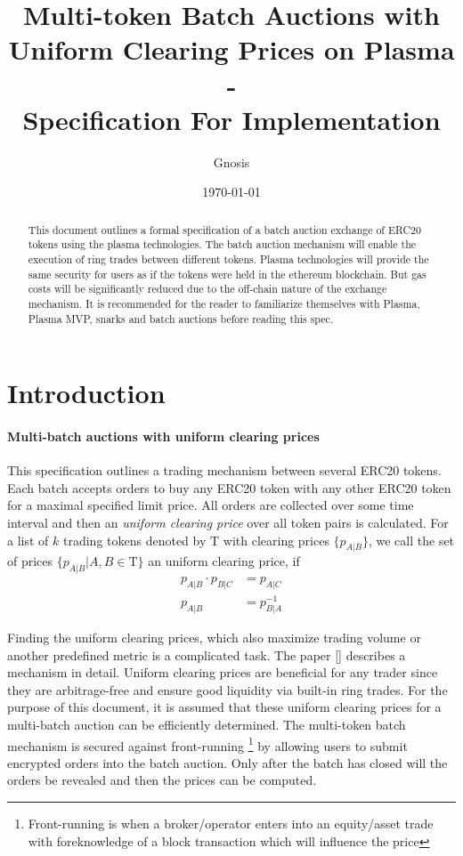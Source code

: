 \documentclass[11pt,parskip=full]{scrartcl}%
\title{
  Multi-token Batch Auctions with Uniform Clearing Prices on Plasma\\
  - \\
  \Large Specification For Implementation}
\author{Gnosis}
\date{\today}
\newcommand{\Tau}{\mathrm{T}}
\newcommand*{\erc}{ERC20 }
\begin{document}
\maketitle


\begin{abstract}

This document outlines a formal specification of a batch auction exchange of ERC20 tokens using the plasma technologies. The batch auction mechanism will enable the execution of ring trades between different tokens. Plasma technologies will provide the same security for users as if the tokens were held in the ethereum blockchain. But gas costs will be significantly reduced due to the off-chain nature of the exchange mechanism. It is recommended for the reader to familiarize themselves with Plasma\cite{plasma}, Plasma MVP\cite{MVP}, snarks\cite{snarks} and batch auctions\cite{batch} before reading this spec.

\end{abstract}

\tableofcontents

\newpage
\section{Introduction}
\label{sec:introduction}

\paragraph{Multi-batch auctions with uniform clearing prices}

This specification outlines a trading mechanism between several \erc tokens. Each batch accepts orders to buy any \erc token with any other \erc token for a maximal specified limit price. All orders are collected over some time interval and then an \emph{uniform clearing price} over all token pairs is calculated. 
For a list of $k$ trading tokens denoted by $\Tau$ with clearing prices $\{p_{A|B}\}$, we call the set of prices $\{p_{A|B}| A,B \in \Tau \}$ an uniform clearing price, if
\begin{align} \label{eq:arbitrage_freeness}
  p_{A|B} \cdot p_{B|C} &= p_{A|C}\\
  p_{A|B} &= p_{B|A}^{-1}
\end{align}

Finding the uniform clearing prices, which also maximize trading volume or another predefined metric is a complicated task. The paper [] describes a mechanism in detail. Uniform clearing prices are beneficial for any trader since they are arbitrage-free and ensure good liquidity via built-in ring trades. For the purpose of this document, it is assumed that these uniform clearing prices for a multi-batch auction can be efficiently determined. \newline
The multi-token batch mechanism is secured against front-running \footnote{Front-running is when a broker/operator enters into an equity/asset trade with foreknowledge of a block transaction which will influence the price} by allowing users to submit encrypted orders into the batch auction. Only after the batch has closed will the orders be revealed and then the prices can be computed. 
\end{document}
